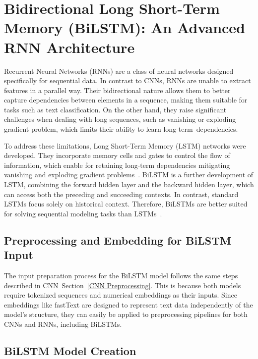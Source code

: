 \section{Bidirectional Long Short-Term Memory (BiLSTM): An Advanced RNN Architecture}


Recurrent Neural Networks (RNNs) are a class of neural networks designed specifically for sequential data. In contrast to CNNs, RNNs are unable to extract features in a parallel way. Their bidirectional nature allows them to better capture dependencies between elements in a sequence, making them suitable for tasks such as text classification. On the other hand, they raise significant challenges when dealing with long sequences, such as vanishing or exploding gradient problem, which limits their ability to learn long-term~dependencies.

\vspace{3mm} 

To address these limitations, Long Short-Term Memory (LSTM) networks were developed. They incorporate memory cells and gates to control the flow of information, which enable for retaining long-term dependencies mitigating vanishing and exploding gradient problems~\cite{hochreiter1997long}. BiLSTM is a further development of LSTM, combining the forward hidden layer and the backward hidden layer, which can access both the preceding and succeeding contexts. In contrast, standard LSTMs focus solely on historical context. Therefore, BiLSTMs are better suited for solving sequential modeling tasks than LSTMs~\cite{liu2019bidirectional}.

\vspace{3mm} 

\subsection*{Preprocessing and Embedding for BiLSTM Input}
The input preparation process for the BiLSTM model follows the same steps described in CNN~Section~\ref{CNN Preprocessing}. This is because both models require tokenized sequences and numerical embeddings as their inputs. Since embeddings like fastText are designed to represent text data independently of the model's structure, they can easily be applied to preprocessing pipelines for both CNNs and RNNs, including BiLSTMs.

\subsection*{BiLSTM Model Creation}

